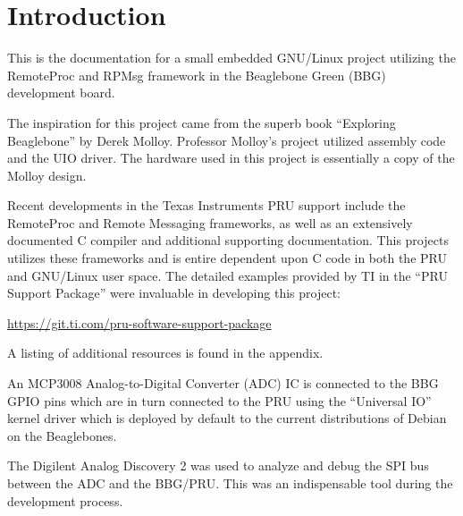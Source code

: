 %
%
%

\chapter{Introduction}

This is the documentation for a small embedded GNU/Linux project utilizing the RemoteProc and RPMsg framework in the Beaglebone Green (BBG) development board.

The inspiration for this project came from the superb book ``Exploring Beaglebone'' by Derek Molloy.  Professor Molloy's project utilized assembly code and the UIO driver.  The hardware used in this project is essentially a copy of the Molloy design.

Recent developments in the Texas Instruments PRU support include the RemoteProc and Remote Messaging frameworks, as well as an extensively documented C compiler and additional supporting documentation.  This projects utilizes these frameworks and is entire dependent upon C code in both the PRU and GNU/Linux user space.  The detailed examples provided by TI in the ``PRU Support Package'' were invaluable in developing this project:

\url{https://git.ti.com/pru-software-support-package}

A listing of additional resources is found in the appendix.

An MCP3008 Analog-to-Digital Converter (ADC) IC is connected to the BBG GPIO pins which are in turn connected to the PRU using the ``Universal IO'' kernel driver which is deployed by default to the current distributions of Debian on the Beaglebones.

The Digilent Analog Discovery 2 was used to analyze and debug the SPI bus between the ADC and the BBG/PRU.  This was an indispensable tool during the development process.
